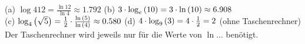 \documentclass[11pt]{exam}
\begin{document}
\begin{questions}
\begin{parts}
\end{parts}
{\begin{solution}
		(a) $\log{4}{12}=\frac{\ln{12}}{\ln{4}}\approx1.792$ \qquad (b) $3\*\log{e}{10}=3\*\ln{10}\approx6.908$\\
		(c) $\log{4}{\sqrt{5}}=\frac{1}{2}\*\frac{\ln{5}}{\ln{4}}\approx0.580$ \qquad (d) $4\*\log{9}{3}=4\*\frac{1}{2}=2$ (ohne Taschenrechner)\\
		Der Taschenrechner wird jeweils nur für die Werte von $\ln{\dots}$ benötigt.
\end{solution}}
{}

\noaddpoints
\question[\totalpoints]
\addpoints
\begin{minipage}{0.6\linewidth}
\end{minipage}
\end{questions}
\end{document}
